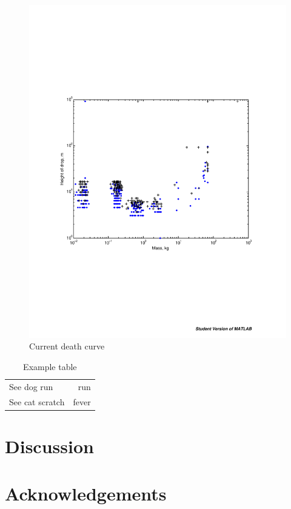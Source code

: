 \documentclass{article}
\begin{document}
\begin{figure}
\begin{center}
\includegraphics[width=\textwidth]{figures/raw-death-curve-height.pdf}
\end{center}
\caption{Current death curve}
\end{figure}

\begin{table}
\begin{center}
\begin{tabular}{lr}
See dog run & run \\
See cat scratch & fever \\
\end{tabular}
\end{center}
\caption{Example table}
\end{table}

\section{Discussion}
\section*{Acknowledgements}


\end{document}
